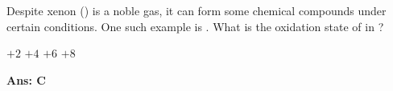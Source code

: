 \documentclass[border=3pt,varwidth=70mm]{standalone}
\begin{document}
 
Despite xenon () is a noble gas, it can form some chemical compounds under certain conditions. One such example is . What is the oxidation state of  in ?


\begin{choices}
\choice $+2$
\choice $+4$
\choice $+6$
\choice $+8$
\end{choices}

\begin{answer}
\hrulefill\par
\textbf{Ans: C}

\end{answer}
\end{document}
